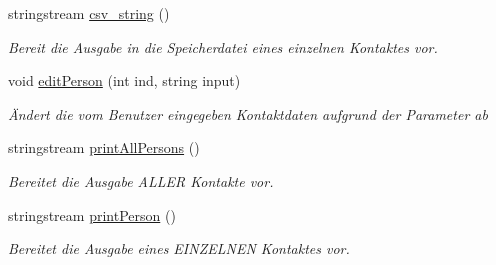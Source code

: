 \begin{DoxyCompactItemize}
stringstream \hyperlink{classContactManager_1_1Person_a3bc1692664e68de81b431caa6a77510b}{csv\+\_\+string} ()
\begin{DoxyCompactList}\small\item\em Bereit die Ausgabe in die Speicherdatei eines einzelnen Kontaktes vor.\end{DoxyCompactList}\item 
void \hyperlink{classContactManager_1_1Person_a90d0e64d4db9d19843a343c6f9564555}{edit\+Person} (int ind, string input)
\begin{DoxyCompactList}\small\item\em Ändert die vom Benutzer eingegeben Kontaktdaten aufgrund der Parameter ab\end{DoxyCompactList}\item 
stringstream \hyperlink{classContactManager_1_1Person_a781616d2e1b0ebe4601b3914d4a03bc3}{print\+All\+Persons} ()
\begin{DoxyCompactList}\small\item\em Bereitet die Ausgabe A\+L\+L\+ER Kontakte vor.\end{DoxyCompactList}\item 
stringstream \hyperlink{classContactManager_1_1Person_ab1be17c0aac5d094a6fd94d9e1fa7ed4}{print\+Person} ()
\begin{DoxyCompactList}\small\item\em Bereitet die Ausgabe eines E\+I\+N\+Z\+E\+L\+N\+EN Kontaktes vor.\end{DoxyCompactList}\end{DoxyCompactItemize}
